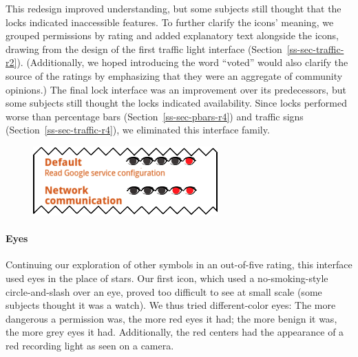 \documentclass[11pt]{article}
\newcommand{\refsec}[1]{Section~\ref{#1}}
\begin{document}
This redesign improved understanding, but 
some subjects still thought that the locks indicated inaccessible features.
To further clarify the icons' meaning, we grouped 
permissions by rating and added explanatory 
text alongside the icons, drawing 
from the design of the first traffic light interface 
(\refsec{ss-sec-traffic-r2}).
(Additionally, we hoped introducing the word ``voted'' 
would also clarify the source of the ratings by emphasizing that they 
were an aggregate of community opinions.)
\label{ss-sec-locks-r4}
The final lock interface was an improvement over its 
predecessors, 
but some subjects still thought the locks indicated 
availability. Since locks 
performed worse than percentage bars (\refsec{ss-sec-pbars-r4}) 
and traffic signs (\refsec{ss-sec-traffic-r4}), 
we eliminated this interface family.


\begin{figure}
\begin{center}
\includegraphics[width=.9\linewidth]{candidate-img/eyes/eyesR2.png}
\end{center}
\end{figure}

\paragraph{Eyes}
\label{s-sec-eyes}

Continuing our exploration of other symbols in an out-of-five rating, this 
interface used eyes in the place of stars. Our first icon, which
used a no-smoking-style circle-and-slash over an eye, 
proved too difficult to see at small scale
(some subjects thought it was a watch). We thus tried different-color eyes:
\label{ss-sec-eyes-r2}
The more dangerous a permission was, the more red eyes it had; the more
benign it was, the more grey eyes it had.
Additionally, the red centers had 
the appearance of a red recording light as seen on a camera.
\end{document}
